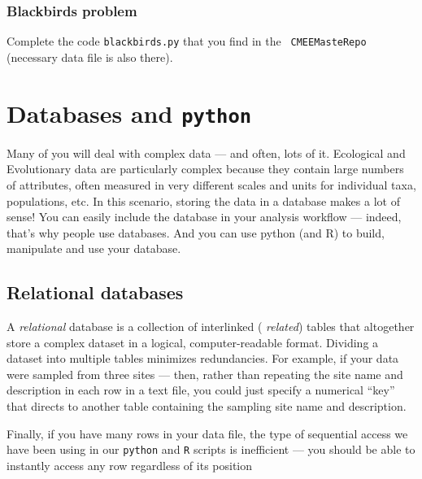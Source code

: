 \subsubsection{Blackbirds problem}

Complete the code {\tt blackbirds.py} that you find in the {\tt 
CMEEMasteRepo} (necessary data file is also there).

\section{Databases and {\tt python}}

Many of you will deal with complex data --- and often, lots of it. 
Ecological and Evolutionary data are particularly complex because they 
contain large numbers of attributes, often measured in very different 
scales and units for individual taxa, populations, etc. In this 
scenario, storing the data in a database makes a lot of sense! You can 
easily include the database in your analysis workflow --- indeed, 
that's why people use databases. And you can use python (and R) to 
build, manipulate and use your database.   

\subsection{Relational databases}

A {\it relational} database is a collection of interlinked ({\it 
related}) tables that altogether store a complex dataset in a logical, 
computer-readable format. Dividing a dataset into multiple tables 
minimizes redundancies. For example, if your data were sampled from 
three sites --- then, rather than repeating the site name and 
description in each row in a text file, you could just specify a 
numerical ``key'' that directs to another table containing the sampling 
site name and description.

Finally, if you have many rows in your data file, the type of 
sequential access we have been using in our {\tt python} and {\tt R} 
scripts is inefficient --- you should be able to instantly access any 
row regardless of its position

